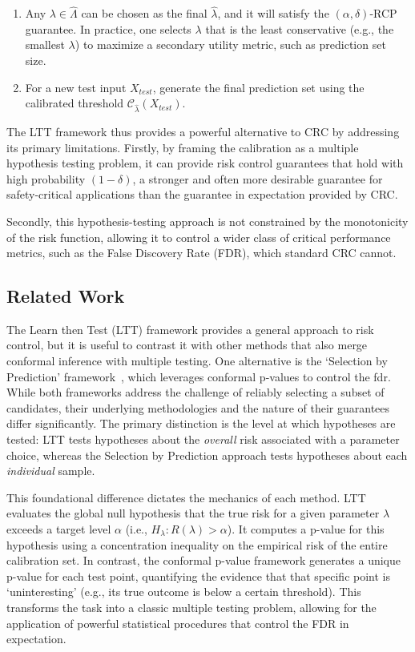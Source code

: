 \begin{enumerate}
    \item Any \(\lambda \in \hat{\Lambda}\) can be chosen as the final \(\hat{\lambda}\),
    and it will satisfy the \((\alpha, \delta)\)-RCP guarantee.
    In practice, one selects \(\lambda\) that is the least conservative
    (e.g., the smallest \(\lambda\)) to maximize a secondary utility metric,
    such as prediction set size.

    \item For a new test input \(X_{test}\), generate the final prediction set
    using the calibrated threshold \(\mathcal{C}_{\hat{\lambda}}(X_{test})\).
\end{enumerate}

The LTT framework thus provides a powerful alternative to CRC by addressing its primary limitations.
Firstly, by framing the calibration as a multiple hypothesis testing problem,
it can provide risk control guarantees that hold with high probability \((1-\delta)\),
a stronger and often more desirable guarantee for safety-critical applications
than the guarantee in expectation provided by CRC.

Secondly, this hypothesis-testing approach is not constrained
by the monotonicity of the risk function,
allowing it to control a wider class of critical performance metrics,
such as the False Discovery Rate (FDR), which standard CRC cannot.

\subsection{Related Work}

The Learn then Test (LTT) framework provides a general approach to risk control,
but it is useful to contrast it with other methods that also merge
conformal inference with multiple testing.
One alternative is the `Selection by Prediction' framework~\cite{jin2023selection},
which leverages conformal p-values to control the \gls{fdr}.
While both frameworks address the challenge of reliably selecting a subset of candidates,
their underlying methodologies and the nature of their guarantees differ significantly.
The primary distinction is the level at which hypotheses are tested:
LTT tests hypotheses about the \emph{overall} risk associated with a parameter choice,
whereas the Selection by Prediction approach tests hypotheses about each \emph{individual} sample.

This foundational difference dictates the mechanics of each method.
LTT evaluates the global null hypothesis that the true risk
for a given parameter \(\lambda\) exceeds a target level \(\alpha\)
(i.e., \(H_\lambda: R(\lambda) > \alpha\)).
It computes a p-value for this hypothesis using a concentration inequality
on the empirical risk of the entire calibration set.
In contrast, the conformal p-value framework generates a unique p-value for each test point,
quantifying the evidence that that specific point is `uninteresting'
(e.g., its true outcome is below a certain threshold).
This transforms the task into a classic multiple testing problem,
allowing for the application of powerful statistical procedures
that control the FDR in expectation.

